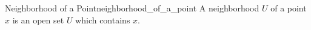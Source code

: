 \begin{definition}{Neighborhood of a Point}{neighborhood_of_a_point}
A neighborhood \( U \) of a point \( x \) is an open set \( U \) which contains
\( x \).
\end{definition}
